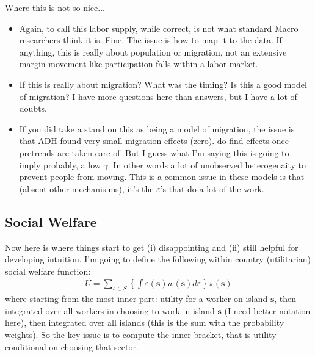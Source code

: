 \documentclass[pdftex,12pt]{article}
\begin{document}
Where this is not so nice...
\begin{itemize}
\item Again, to call this labor supply, while correct, is not what standard Macro researchers think it is. Fine. The issue is how to map it to the data. If anything, this is really about population or migration, not an extensive margin movement like participation falls within a labor market.
    
\item If this is really about migration? What was the timing? Is this a good model of migration? I have more questions here than answers, but I have a lot of doubts. 

\item If you did take a stand on this as being a model of migration, the issue is that ADH found very small migration effects (zero). \citet{greenland2017import} do find effects once pretrends are taken care of. But I guess what I'm saying this is going to imply probably, a low $\gamma$. In other words a lot of unobserved heterogenaity to prevent people from moving. This is a common issue in these models is that (absent other mechanisims), it's the $\varepsilon$'s that do a lot of the work.
\end{itemize}

\newpage

\subsection{Social Welfare}

Now here is where things start to get (i) disappointing and (ii) still helpful for developing intuition. I'm going to define the following within country (utilitarian) social welfare function:
\begin{align}
U = \sum_{s \in S} \left\{\int \varepsilon(\textbf{s}) w(\textbf{s})d\varepsilon \right\} \pi(\textbf{s})
\label{eq:expected_utility}
\end{align}
where starting from the most inner part: utility for a worker on island $\textbf{s}$, then integrated over all workers in choosing to work in island $\textbf{s}$ (I need better notation here), then integrated over all islands (this is the sum with the probability weights). So the key issue is to compute the inner bracket, that is utility conditional on choosing that sector.
\end{document}
